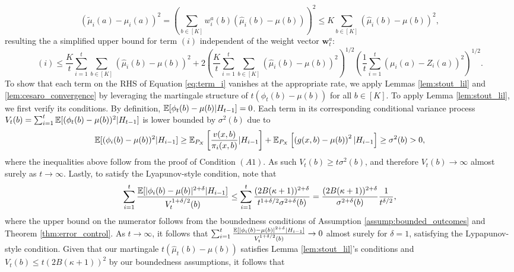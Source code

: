 \documentclass{article}
\begin{document}
\begin{appendices}
\begin{equation}
    (\tilde\mu_i(a) - \mu_i(a))^2 = \left(\sum_{b \in [K]} w_i^a(b)\left(\hat\mu_i(b) - \mu(b)\right)\right)^2
\leq K\sum_{b \in [K]} \left(\hat\mu_i(b) - \mu(b) \right)^2,
\end{equation}
resulting the a simplified upper bound for term $(i)$ independent of the weight vector $\bm{w}_t^a$:
\begin{equation}\label{eq:term_i}
    (i) \leq \frac{K}{t}\sum_{i=1}^t \sum_{b \in [K]}\left( \hat\mu_i(b) - \mu(b) \right)^2 + 2\left(\frac{K}{t}\sum_{i=1}^t \sum_{b \in [K]} (\hat\mu_i(b) - \mu(b))^2 \right)^{1/2}\left(\frac{1}{t}\sum_{i=1}^t (\mu_i(a) - Z_i(a))^2\right)^{1/2}.
\end{equation}
To show that each term on the RHS of Equation \eqref{eq:term_i} vanishes at the appropriate rate, we apply Lemmas \ref{lem:stout_lil} and \ref{lem:cesaro_convergence} by leveraging the martingale structure of $t\left( \phi_t(b) - \mu(b) \right)$ for all $b \in [K]$. To apply Lemma \ref{lem:stout_lil}, we first verify its conditions. By definition, $\mathbb{E}[\phi_t(b) - \mu(b)|H_{t-1}] = 0$. Each term in its corresponding conditional variance process $V_t(b) = \sum_{i=1}^t \mathbb{E}[(\phi_t(b) - \mu(b))^2| H_{t-1}]$ is lower bounded by $\sigma^2(b)$ due to  
\begin{equation}
    \mathbb{E}[(\phi_i(b) - \mu(b))^2| H_{i-1}] \geq \mathbb{E}_{P_X}\left[ \frac{v(x,b)}{\pi_i(x,b)} | H_{i-1}\right] + \mathbb{E}_{P_X}\left[ \left(g(x,b) - \mu(b)\right)^2 | H_{i-1}\right] \geq \sigma^2(b) > 0,
\end{equation}
where the inequalities above follow from the proof of Condition $(A1)$. As such $V_t(b) \geq t\sigma^2(b)$, and therefore $V_t(b) \rightarrow \infty$ almost surely as $t \rightarrow \infty$. Lastly, to satisfy the Lyapunov-style condition, note that
\begin{equation}
    \sum_{i=1}^t \frac{\mathbb{E}[|\phi_i(b) - \mu(b)|^{2+\delta} |H_{i-1}]}{V_t^{1+\delta/2}(b)} \leq \sum_{i=1}^t\frac{  (2B(\kappa+1))^{2+\delta}}{t^{1+\delta/2}\sigma^{2+\delta}(b)}  = \frac{(2B(\kappa+1))^{2+\delta}}{\sigma^{2+\delta}(b)}\frac{1}{t^{\delta/2}},
\end{equation}
where the upper bound on the numerator follows from the boundedness conditions of Assumption \ref{assump:bounded_outcomes} and Theorem \ref{thm:error_control}. As $t \rightarrow \infty$, it follows that $\sum_{i=1}^t \frac{\mathbb{E}[|\phi_i(b) - \mu(b)|^{2+\delta} |H_{i-1}]}{V_t^{1+\delta/2}(b)} \rightarrow 0$ almost surely for $\delta = 1$, satisfying the Lypapunov-style condition. Given that our martingale $t(\hat\mu_t(b) - \mu(b))$ satisfies Lemma \ref{lem:stout_lil}'s conditions and $V_t(b) \leq t(2B(\kappa + 1))^2$ by our boundedness assumptions, it follows that 

\end{appendices}
\end{document}
